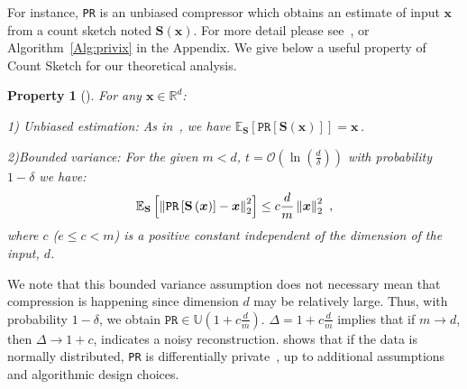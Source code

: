 \documentclass[sigconf, anonymous, review]{acmart}
\newtheorem{property}{Property}
\begin{document}
For instance, \texttt{PR} is an unbiased compressor which obtains an estimate of input $\boldsymbol{x}$ from a count sketch noted $\boldsymbol{S}(\boldsymbol{x})$. For more detail please see~\citep{li2019privacy}, or Algorithm~\ref{Alg:privix} in the Appendix.
We give below a useful property of Count Sketch for our theoretical analysis.
\begin{property}[\citep{li2019privacy}]\label{prop:1}
For any $\boldsymbol{x}\in \mathbb{R}^{d}$:

1) \textit{Unbiased estimation}: As in~\citep{li2019privacy}, we have $ \mathbb{E}_{\mathbf{S}}\left[\texttt{PR}\left[\mathbf{S}\left(\boldsymbol{x}\right)\right]\right]=\boldsymbol{x}\, $.

2)\textit{Bounded variance:} For the given $m<d$, $t=\mathcal{O}\left(\ln \left(\frac{d}{\delta}\right)\right)$ with probability $1-\delta$ we have:
    \begin{align}\notag
        \mathbb{E}_{\mathbf{S}}\left[\left\|\texttt{PR}\left[\mathbf{S}\left(\boldsymbol{x}\right)\right]-\boldsymbol{x}\right\|_2^2\right] \leq c\frac{d}{m}\left\|\boldsymbol{x}\right\|_2^2\ , 
    \end{align}
 where $c$ ($e\leq c<m$) is a positive constant independent of the dimension of the input, $d$.
\end{property}
 We note that this bounded variance assumption does not necessary mean that compression is happening since dimension $d$ may be relatively large. 
Thus, with probability $1-\delta$, we obtain $\texttt{PR}\in \mathbb{U}(1+c\frac{d}{m})$.
 $\Delta=1+c\frac{d}{m}$ implies that if $m\rightarrow d$, then $\Delta\rightarrow 1+c$, indicates a noisy reconstruction. 
 \citep{li2019privacy} shows that if the data is normally distributed, \texttt{PR} is differentially private~\citep{DBLP:conf/icalp/Dwork06}, up to additional assumptions and algorithmic design choices.
\end{document}
